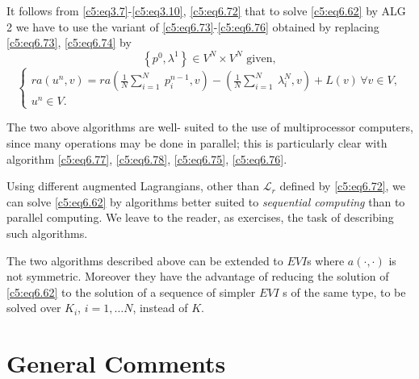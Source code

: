  It follows from \eqref{c5:eq3.7}-\eqref{c5:eq3.10}, \eqref{c5:eq6.72} 
 that to solve \eqref{c5:eq6.62} by ALG 2 we have to use the variant of 
 \eqref{c5:eq6.73}-\eqref{c5:eq6.76} obtained by replacing 
 \eqref{c5:eq6.73}, \eqref{c5:eq6.74} by    
 \begin{equation}
\left\{ p^0, \lambda^1 \right\} \in V^N \times V^N \text{ given},
\tag{6.77}\label{c5:eq6.77} 
\end{equation}  
\begin{equation}
\begin{cases}
ra (u^n, v) = ra \displaystyle{\left(\frac{1}{N}\sum^N_{i=1} ~
  p^{n-1}_i , v\right) -  
\left(\frac{1}{N} \sum^N_{i=1} ~ \lambda^N_i, v\right) + L (v)\,
\forall v \in V,} \\  
u^n \in V.  \tag{6.78}\label{c5:eq6.78}
\end{cases}
\end{equation}

\begin{remark}\label{c5:rem6.9}%
 The two above algorithms are well- suited to the use of multiprocessor 
 computers,  since many operations may be done in parallel; this is 
 particularly clear with algorithm \eqref{c5:eq6.77}, 
 \eqref{c5:eq6.78}, \eqref{c5:eq6.75}, \eqref{c5:eq6.76}.     
\end{remark}

\begin{remark}\label{c5:rem6.10}%
Using different augmented Lagrangians,  other than $\mathscr{L}_r$  
defined by \eqref{c5:eq6.72}, we can solve \eqref{c5:eq6.62} by 
algorithms better suited to {\em  sequential computing} than to 
parallel computing. We leave to the reader, as exercises,  the task of 
describing such algorithms.      
\end{remark}

\begin{remark}\label{c5:rem6.11}%
The two algorithms described above can be extended to $EVI$s where $a 
(\cdot, \cdot)$ is not symmetric. Moreover they have the advantage of 
reducing the solution of \eqref{c5:eq6.62} to the solution of a 
sequence of simpler $EVI$ s of the same type,  to be solved over $K_i$, 
$i=1, \ldots N$,  instead of $K$.     
\end{remark} 
 
\section{General Comments}\label{c5:s7}
 
